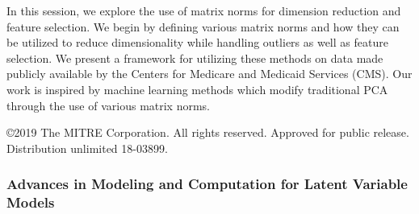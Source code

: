 \begin{itemize}
In this session, we explore the use of matrix norms for dimension reduction and feature selection.  We begin by defining various matrix norms and how they can be utilized to reduce dimensionality while handling outliers as well as feature selection. We present a framework for utilizing these methods on data made publicly available by the Centers for Medicare and Medicaid Services (CMS). Our work is inspired by machine learning methods which modify traditional PCA through the use of various matrix norms. 

©2019 The MITRE Corporation. All rights reserved. Approved for public release. Distribution unlimited 18-03899. 

\end{itemize}

\subsubsection*{Advances in Modeling and Computation for Latent Variable Models}

